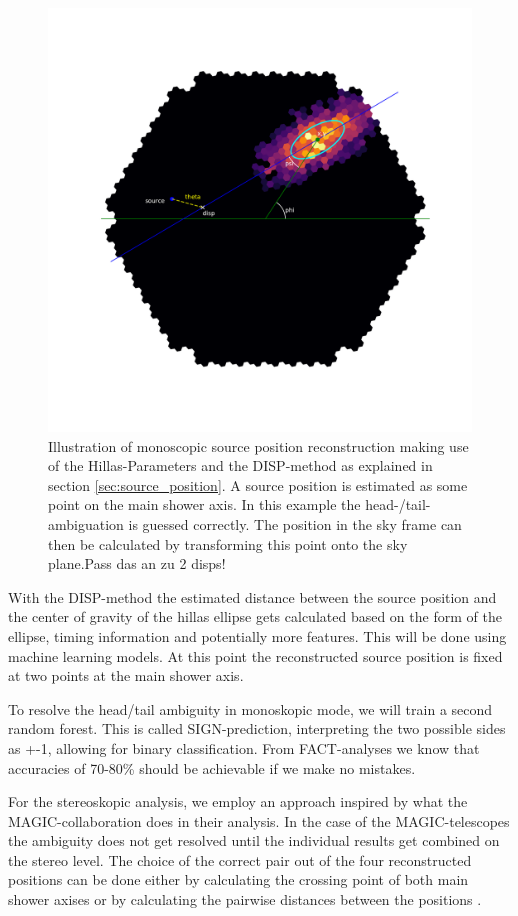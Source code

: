 \begin{figure}
    \includegraphics[width=0.6\linewidth]{Plots/hillas_complete.pdf}
    \caption{Illustration of monoscopic source position reconstruction making use of 
        the Hillas-Parameters and the DISP-method as explained in section \ref{sec:source_position}.
	A source position is estimated as some point on the main shower axis.
	In this example the head-/tail-ambiguation is guessed correctly.
	The position in the sky frame can then be calculated by transforming this
	point onto the sky plane.Pass das an zu 2 disps!}
    \label{fig:disp}
\end{figure}

With the DISP-method the estimated distance between the source
position and the center of gravity of the hillas ellipse gets calculated
based on the form of the ellipse, timing information and potentially
more features.
This will be done using machine learning models.
At this point the reconstructed source position
is fixed at two points at the main shower axis.

To resolve the head/tail ambiguity in monoskopic mode,
we will train a second random forest.
This is called SIGN-prediction, interpreting the two possible sides
as +-1, allowing for binary classification.
From FACT-analyses we know that accuracies of 70-80\% should be achievable
if we make no mistakes.

For the stereoskopic analysis, we employ an approach inspired by 
what the MAGIC-collaboration does in their analysis.
In the case of the MAGIC-telescopes the ambiguity does not
get resolved until the individual results get combined
on the stereo level. The choice of the correct
pair out of the four reconstructed positions can be done either
by calculating the crossing point of both main shower axises
or by calculating the pairwise distances between the positions \cite{magic disp paper}.


